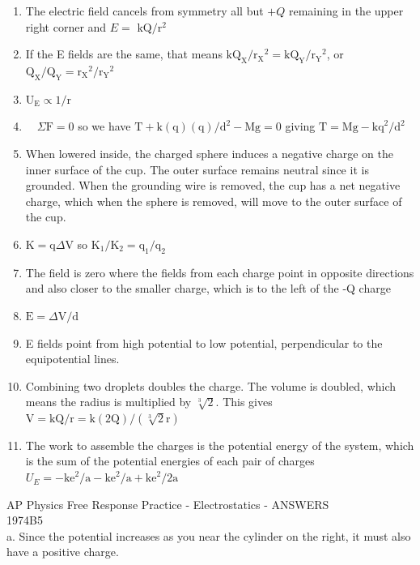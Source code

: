 \begin{enumerate}
\begin{enumerate}
  \item The electric field cancels from symmetry all but $+Q$ remaining in the upper right corner and $E=$ $\mathrm{kQ} / \mathrm{r}^{2}$
  \item If the E fields are the same, that means $\mathrm{kQ}_{\mathrm{X}} / \mathrm{r}_{\mathrm{X}}{ }^{2}=\mathrm{kQ}_{\mathrm{Y}} / \mathrm{r}_{\mathrm{Y}}{ }^{2}$, or $\mathrm{Q}_{\mathrm{X}} / \mathrm{Q}_{\mathrm{Y}}=\mathrm{r}_{\mathrm{X}}{ }^{2} / \mathrm{r}_{\mathrm{Y}}{ }^{2}$
  \item $\mathrm{U}_{\mathrm{E}} \propto 1 / \mathrm{r}$
  \item $\quad \Sigma \mathrm{F}=0$ so we have $\mathrm{T}+\mathrm{k}(\mathrm{q})(\mathrm{q}) / \mathrm{d}^{2}-\mathrm{Mg}=0$ giving $\mathrm{T}=\mathrm{Mg}-\mathrm{kq}^{2} / \mathrm{d}^{2}$
  \item When lowered inside, the charged sphere induces a negative charge on the inner surface of the cup. The outer surface remains neutral since it is grounded. When the grounding wire is removed, the cup has a net negative charge, which when the sphere is removed, will move to the outer surface of the cup.
  \item $\mathrm{K}=\mathrm{q} \Delta \mathrm{V}$ so $\mathrm{K}_{1} / \mathrm{K}_{2}=\mathrm{q}_{1} / \mathrm{q}_{2}$
  \item The field is zero where the fields from each charge point in opposite directions and also closer to the smaller charge, which is to the left of the -Q charge
  \item $\mathrm{E}=\Delta \mathrm{V} / \mathrm{d}$
  \item E fields point from high potential to low potential, perpendicular to the equipotential lines.
  \item Combining two droplets doubles the charge. The volume is doubled, which means the radius is multiplied by $\sqrt[3]{2}$. This gives $\mathrm{V}=\mathrm{kQ} / \mathrm{r}=\mathrm{k}(2 \mathrm{Q}) /(\sqrt[3]{2} \mathrm{r})$
  \item The work to assemble the charges is the potential energy of the system, which is the sum of the potential energies of each pair of charges $U_{E}=-\mathrm{ke}^{2} / \mathrm{a}-\mathrm{ke}^{2} / \mathrm{a}+\mathrm{ke}^{2} / 2 \mathrm{a}$
\end{enumerate}

AP Physics Free Response Practice - Electrostatics - ANSWERS\\
1974B5\\
a. Since the potential increases as you near the cylinder on the right, it must also have a positive charge.


\end{enumerate}
